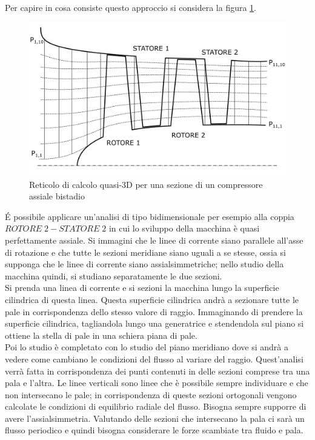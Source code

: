 Per capire in cosa consiste questo approccio si considera la figura \ref{fig:ReticoloComp1}.
\begin{figure}
\centering
  \includegraphics[width=.8\textwidth]{fig/ReticoloComp.pdf}
\caption{Reticolo di calcolo quasi-3D per una sezione di un compressore assiale bistadio}
\label{fig:ReticoloComp1}
\end{figure}
\'E possibile applicare un’analisi di tipo bidimensionale per esempio alla coppia $ROTORE\;2 - STATORE\;2$ in cui lo sviluppo della macchina è quasi perfettamente assiale. Si immagini che le linee di corrente siano parallele all'asse di rotazione e che tutte le sezioni meridiane siano uguali a se stesse, ossia si supponga che le linee di corrente siano assialsimmetriche; nello studio della macchina quindi, si studiano separatamente le due sezioni.\\
Si prenda una linea di corrente e si sezioni la macchina lungo la superficie cilindrica di questa linea. Questa superficie cilindrica andrà a sezionare tutte le pale in corrispondenza dello stesso valore di raggio. Immaginando di prendere la superficie cilindrica, tagliandola lungo una generatrice e stendendola sul piano si ottiene la stella di pale in una schiera piana di pale.\\
Poi lo studio è completato con lo studio del piano meridiano dove si andrà a vedere come cambiano le condizioni del flusso al variare del raggio. Quest'analisi verrà fatta in corrispondenza dei punti contenuti in delle sezioni comprese tra una pala e l’altra. Le linee verticali sono linee che è possibile sempre individuare e che non intersecano le pale; in corrispondenza di queste sezioni ortogonali vengono calcolate le condizioni di equilibrio radiale del flusso. Bisogna sempre supporre di avere l'assialsimmetria. Valutando delle sezioni che intersecano la pala ci sarà un flusso periodico e quindi bisogna considerare le forze scambiate tra fluido e pala.\\
